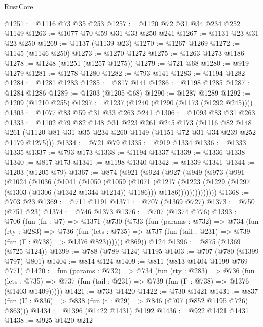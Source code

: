 \begin{lexlean}{RustCore}
\begin{coremodule}
@1251 := @1116 @73 @35 @253
@1257 := @1120 @72 @31 @34 @234 @252 @1149
@1263 := @1077 @70 @59 @31 @33 @250 @241
@1267 := @1131 @23 @31 @23 @250
@1269 := @1137 (@1139 @23)
@1270 := @1267 @1269
@1272 := @1145 (@1146 @250)
@1273 := @1270 @1272
@1275 := @1263 @1273 @1186
@1278 := @1248 (@1251 (@1257 @1275))
@1279 := @721 @68
@1280 := @919 @1279
@1281 := @1278 @1280
@1282 := @793 @141
@1283 := @1194 @1282
@1284 := @1281 @1283
@1285 := @817 @141
@1286 := @1198 @1285
@1287 := @1284 @1286
@1289 := @1203 (@1205 @68)
@1290 := @1287 @1289
@1292 := @1209 (@1210 @255)
@1297 := @1237 (@1240 (@1290 (@1173 (@1292 @245))))
@1303 := @1077 @83 @59 @31 @33 @263 @241
@1306 := @1093 @83 @31 @263
@1333 := @1102
    @79
    @82
    @148
    @31
    @223
    @261
    @245
    @173
    (@1116
      @82
      @148
      @261
      (@1120 @81 @31 @35 @234 @260 @1149 (@1151 @72 @31 @34 @239 @252 @1179 @1275)))
@1334 := @721 @79
@1335 := @919 @1334
@1336 := @1333 @1335
@1337 := @793 @173
@1338 := @1194 @1337
@1339 := @1336 @1338
@1340 := @817 @173
@1341 := @1198 @1340
@1342 := @1339 @1341
@1344 := @1203 (@1205 @79)
@1367 := @874
    (@921
      (@924
        (@927
          (@949
            (@973
              (@991
                (@1024
                  (@1036
                    (@1041
                      (@1050
                        (@1059
                          (@1071
                            (@1217
                              (@1223
                                (@1229 (@1297 (@1303 (@1306 (@1342 @1344 @1214)) @1186)))
                                @1186))))))))))))))
@1368 := @703 @23
@1369 := @711 @1191
@1371 := @707 (@1369 @727)
@1373 := @750 (@751 @23)
@1374 := @746 @1373
@1376 := @707 (@1374 @776)
@1393 := @706
    (fun (fn : @7) =>
    @1371
      (@730
        (@733
          (fun (params : @732) =>
          @734
            (fun (rty : @283) =>
            @736
              (fun (lets : @735) =>
              @737 (fun (tail : @231) => @739 (fun (Γ : @738) => @1376 @823))))))
        @869))
    @124
@1396 := @875 (@1369 (@725 @124))
@1399 := @788 (@789 @124) @1195
@1403 := @707 (@780 (@1399 @797) @801)
@1404 := @814 @124
@1409 := @811 (@813 @1404 @1199 @769 @771)
@1420 := fun (params : @732) =>
  @734
    (fun (rty : @283) =>
    @736
      (fun (lets : @735) =>
      @737 (fun (tail : @231) => @739 (fun (Γ : @738) => @1376 (@1403 @1409)))))
@1421 := @733 @1420
@1422 := @730 @1421
@1431 := @837 (fun (U : @836) => @838 (fun (t : @29) => @846 (@707 (@852 @1195 @726) @863)))
@1434 := @1396 (@1422 @1431) @1192
@1436 := @922 @1421 @1431
@1438 := @925 @1420 @212

\end{coremodule}
\end{lexlean}
